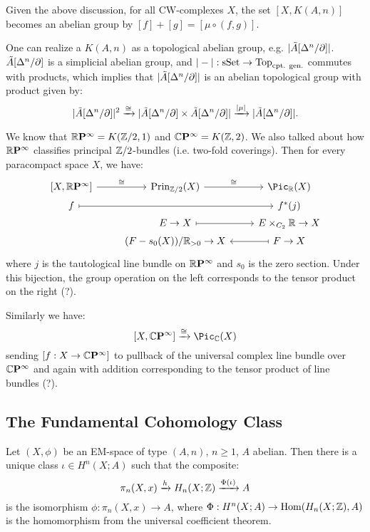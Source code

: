 

Given the above discussion, for all CW-complexes $X$, the set $[X,K(A,n)]$ becomes an abelian group by $[f]+[g]=[\mu\circ(f,g)]$.

\begin{remark}
One can realize a $K(A,n)$ as a topological abelian group, e.g. $|\tilde A[\Delta^n/\partial]|$. $\tilde A[\Delta^n/\partial]$ is a simplicial abelian group, and $|-|:{\mathrm{sSet}}\to{\mathrm{Top}}_\text{cpt. gen.}$ commutes with products, which implies that $|\tilde A[\Delta^n/\partial]|$ is an abelian topological group with product given by:
\[|\tilde A[\Delta^n/\partial]|^2\xrightarrow{\cong}|\tilde A[\Delta^n/\partial]\times\tilde A[\Delta^n/\partial]|\xrightarrow{|\mu|}|\tilde A[\Delta^n/\partial]|.\]
\end{remark}

\begin{example}
We know that ${{\mathbb R}\mathbf{P}^{\infty}}=K({\mathbb Z}/2,1)$ and ${\mathbb{C}\mathbf{P}^{\infty}}=K({\mathbb Z},2)$. We also talked about how ${{\mathbb R}\mathbf{P}^{\infty}}$ classifies principal ${\mathbb Z}/2$-bundles (i.e. two-fold coverings). Then for every paracompact space $X$, we have:
\[
\begin{tikzcd}
    \left[X,\rp{\infty}\right] \ar[r,"\cong"] & \operatorname{Prin}_{\Z/2}(X) \ar[r,"\cong"] & \Pic_\R(X)\\[-4ex]
    f \ar[rr,mapsto] & & f^* (j)\\[-4ex]
    & E\to X \ar[r,mapsto] & E\times_{C_2}\R\to X\\[-4ex]
    & (F-s_0(X))/\R_{>0}\to X & F\to X \ar[l,mapsto]
\end{tikzcd}
\]
where $j$ is the tautological line bundle on ${{\mathbb R}\mathbf{P}^{\infty}}$ and $s_0$ is the zero section. Under this bijection, the group operation on the left corresponds to the tensor product on the right (?).

Similarly we have:
\[[X,\cp{\infty}]\xto{\cong}\Pic_\CC(X)\]
sending $[f:X\to{\mathbb{C}\mathbf{P}^{\infty}}]$ to pullback of the universal complex line bundle over ${\mathbb{C}\mathbf{P}^{\infty}}$ and again with addition corresponding to the tensor product of line bundles (?).
\end{example}

\subsection{The Fundamental Cohomology Class}

\begin{propdef}\label{propdef:fundamental-cohomology-class}
Let $(X,\phi)$ be an EM-space of type $(A,n)$, $n\ge1$, $A$ abelian. Then there is a unique class $\iota\in H^n(X;A)$ such that the composite:
\[\pi_n(X,x)\xrightarrow{h}H_n(X;{\mathbb Z})\xrightarrow{\Phi(\iota)}A\]
is the isomorphism $\phi:\pi_n(X,x)\to A$, where $\Phi:H^n(X;A)\to\operatorname{Hom}(H_n(X;{\mathbb Z}),A)$ is the homomorphism from the universal coefficient theorem.
\end{propdef}

